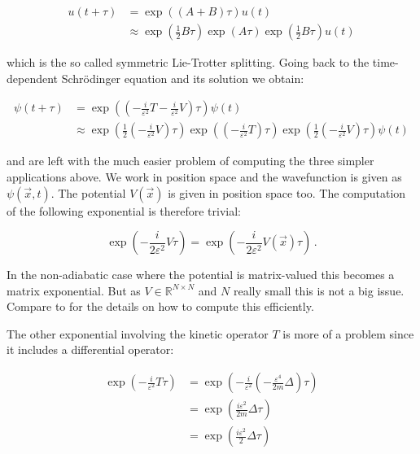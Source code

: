 \begin{align*}
  u(t+\tau) & = \exp\left((A+B)\tau\right) u(t) \\
            & \approx \exp\left(\frac{1}{2}B\tau\right)
                      \exp\left(A\tau\right)
                      \exp\left(\frac{1}{2}B\tau\right) u(t)
\end{align*}

which is the so called symmetric Lie-Trotter splitting. Going back to the
time-dependent Schrödinger equation and its solution we obtain:

\begin{align*}
  \psi(t+\tau) & = \exp\left(\left(-\frac{i}{\varepsilon^2} T -\frac{i}{\varepsilon^2} V\right) \tau\right) \psi(t) \\
               & \approx \exp\left(\frac{1}{2}\left(-\frac{i}{\varepsilon^2} V\right) \tau\right)
                         \exp\left(\left(-\frac{i}{\varepsilon^2} T\right) \tau\right)
                         \exp\left(\frac{1}{2}\left(-\frac{i}{\varepsilon^2} V\right) \tau\right)
                         \psi(t)
\end{align*}

and are left with the much easier problem of computing the three simpler applications
above. We work in position space and the wavefunction is given as $\psi(\vec{x}, t)$.
The potential $V(\vec{x})$ is given in position space too. The computation of the
following exponential is therefore trivial:

\begin{equation}
  \exp\left(-\frac{i}{2\varepsilon^2} V \tau\right) = \exp\left(-\frac{i}{2\varepsilon^2} V(\vec{x}) \tau\right) \,.
\end{equation}

In the non-adiabatic case where the potential is matrix-valued this becomes
a matrix exponential. But as $V \in \mathbb{R}^{N \times N}$ and $N$ really
small this is not a big issue. Compare to \cite{B_bachelor_thesis} for the
details on how to compute this efficiently.

The other exponential involving the kinetic operator $T$ is more of a problem
since it includes a differential operator:

\begin{equation}
\begin{split}
  \exp\left(-\frac{i}{\varepsilon^2} T \tau\right)
  & = \exp\left(-\frac{i}{\varepsilon^2} \left(-\frac{\varepsilon^4}{2m}\Delta\right) \tau\right) \\
  & = \exp\left(\frac{i\varepsilon^2}{2m}\Delta\tau\right) \\
  & = \exp\left(\frac{i\varepsilon^2}{2}\Delta\tau\right)
\end{split}
\end{equation}

